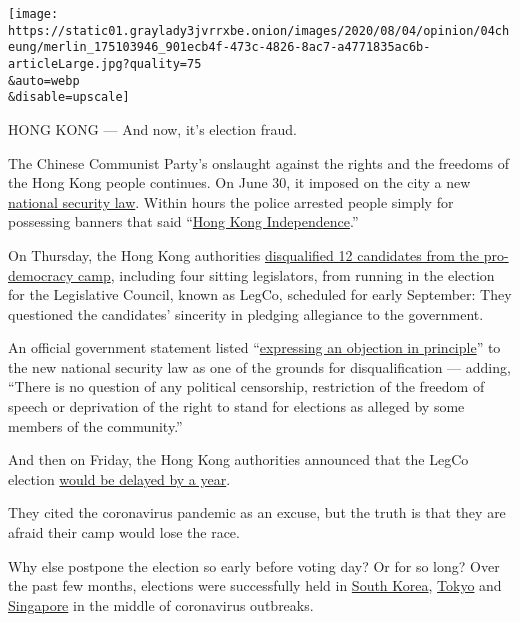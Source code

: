 \texttt{[image: https://static01.graylady3jvrrxbe.onion/images/2020/08/04/opinion/04cheung/merlin\_175103946\_901ecb4f-473c-4826-8ac7-a4771835ac6b-articleLarge.jpg?quality=75\\\&auto=webp\\\&disable=upscale]}

HONG KONG --- And now, it's election fraud.

The Chinese Communist Party's onslaught against the rights and the
freedoms of the Hong Kong people continues. On June 30, it imposed on
the city a new
\href{https://www.gld.gov.hk/egazette/pdf/20202448e/egn2020244872.pdf}{national
security law}. Within hours the police arrested people simply for
possessing banners that said
``\href{https://twitter.com/hkpoliceforce/status/1278201222457987073}{Hong
Kong Independence}.''

On Thursday, the Hong Kong authorities
\href{https://www.nytimes3xbfgragh.onion/2020/07/29/world/asia/hong-kong-arrests-security-law.html}{disqualified
12 candidates from the pro-democracy camp}, including four sitting
legislators, from running in the election for the Legislative Council,
known as LegCo, scheduled for early September: They questioned the
candidates' sincerity in pledging allegiance to the government.

An official government statement listed
``\href{https://www.info.gov.hk/gia/general/202007/30/P2020073000481.htm}{expressing
an objection in principle}'' to the new national security law as one of
the grounds for disqualification --- adding, ``There is no question of
any political censorship, restriction of the freedom of speech or
deprivation of the right to stand for elections as alleged by some
members of the community.''

And then on Friday, the Hong Kong authorities announced that the LegCo
election
\href{https://www.nytimes3xbfgragh.onion/2020/07/31/world/asia/hong-kong-election-delayed.html}{would
be delayed by a year}.

They cited the coronavirus pandemic as an excuse, but the truth is that
they are afraid their camp would lose the race.

Why else postpone the election so early before voting day? Or for so
long? Over the past few months, elections were successfully held in
\href{https://www.nytimes3xbfgragh.onion/2020/04/15/world/asia/south-korea-election.html}{South
Korea},
\href{https://www.nytimes3xbfgragh.onion/2020/07/05/world/asia/tokyo-governor-election.html}{Tokyo}
and
\href{https://www.nytimes3xbfgragh.onion/2020/07/10/world/asia/singapore-election-results.html}{Singapore}
in the middle of coronavirus outbreaks.

